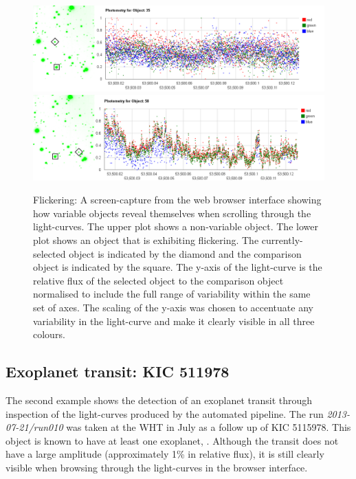 \begin{figure}
\centering
\includegraphics[width=150mm]{images/gumus-comparison-lc.png}
\includegraphics[width=150mm]{images/gumus-discovery-lc.png}
\caption{Flickering: A screen-capture from the web browser interface showing how variable objects reveal themselves when scrolling through the light-curves. The upper plot shows a non-variable object. The lower plot shows an object that is exhibiting flickering.  The currently-selected object is indicated by the diamond and the comparison object is indicated by the square. The y-axis of the light-curve is the relative flux of the selected object to the comparison object normalised to include the full range of variability within the same set of axes. The scaling of the y-axis was chosen to accentuate any variability in the light-curve and make it clearly visible in all three colours.}
\label{fig:gumus-discovery}
\end{figure}

\subsection{Exoplanet transit: KIC 511978}
The second example shows the detection of an exoplanet transit through inspection of the light-curves produced by the automated pipeline. The run \emph{2013-07-21/run010} was taken at the WHT in July as a follow up of KIC 5115978. This object is known to have at least one exoplanet, \citep{KIC5115978}. Although the transit does not have a large amplitude (approximately 1\% in relative flux), it is still clearly visible when browsing through the light-curves in the browser interface. 

